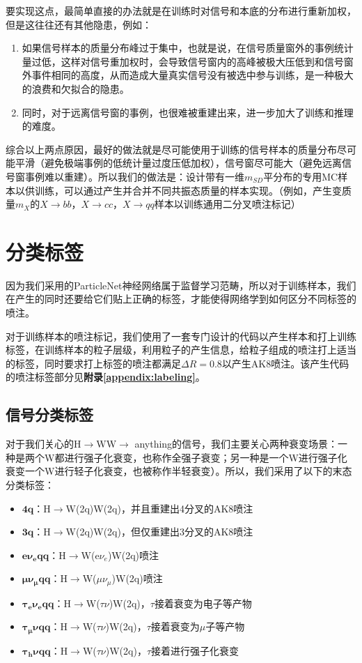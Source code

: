 要实现这点，最简单直接的办法就是在训练时对信号和本底的分布进行重新加权，但是这往往还有其他隐患，例如：
\begin{enumerate}[(1)]
    \item 如果信号样本的质量分布峰过于集中，也就是说，在信号质量窗外的事例统计量过低，这样对信号重加权时，会导致信号窗内的高峰被极大压低到和信号窗外事件相同的高度，从而造成大量真实信号没有被选中参与训练，是一种极大的浪费和欠拟合的隐患。
    \item 同时，对于远离信号窗的事例，也很难被重建出来，进一步加大了训练和推理的难度。
\end{enumerate}

综合以上两点原因，最好的做法就是尽可能使用于训练的信号样本的质量分布尽可能平滑（避免极端事例的低统计量过度压低加权），信号窗尽可能大（避免远离信号窗事例难以重建）。所以我们的做法是：设计带有一维$ m_{SD}$平分布的专用MC样本以供训练，可以通过产生并合并不同共振态质量的样本实现。（例如，产生变质量$m_X$的$X\to bb$，$X\to cc$，$X\to qq$样本以训练通用二分叉喷注标记）

\section{分类标签}
因为我们采用的ParticleNet神经网络属于监督学习范畴，所以对于训练样本，我们在产生的同时还要给它们贴上正确的标签，才能使得网络学到如何区分不同标签的喷注。

对于训练样本的喷注标记，我们使用了一套专门设计的代码\cite{dnntuples}以产生样本和打上训练标签，在训练样本的粒子层级，利用粒子的产生信息，给粒子组成的喷注打上适当的标签，同时要求打上标签的喷注都满足$\Delta R=0.8$以产生AK8喷注。该产生代码的喷注标签部分见\textbf{附录\ref{appendix:labeling}}。

\subsection{信号分类标签}
对于我们关心的H$\to$WW$\to$ anything的信号，我们主要关心两种衰变场景：一种是两个W都进行强子化衰变，也称作全强子衰变；另一种是一个W进行强子化衰变一个W进行轻子化衰变，也被称作半轻衰变）。所以，我们采用了以下的末态分类标签：
\begin{itemize}
    \item $\mathbf{4q}$：H$\to$W(2q)W(2q)，并且重建出4分叉的AK8喷注
    \item $\mathbf{3q}$：H$\to$W(2q)W(2q)，但仅重建出3分叉的AK8喷注
    \item $\mathbf{e\nu_e qq}$：H$\to$W(e$\nu_e$)W(2q)喷注
    \item $\mathbf{\mu\nu_\mu qq}$：H$\to$W($\mu\nu_\mu$)W(2q)喷注
    \item $\mathbf{\tau_e\nu_eqq}$：H$\to$W($\tau\nu$)W(2q)，$\tau$接着衰变为电子等产物
    \item $\mathbf{\tau_\mu\nu qq}$：H$\to$W($\tau\nu$)W(2q)，$\tau$接着衰变为$\mu$子等产物
    \item $\mathbf{\tau_h\nu qq}$：H$\to$W($\tau\nu$)W(2q)，$\tau$接着进行强子化衰变
\end{itemize}
